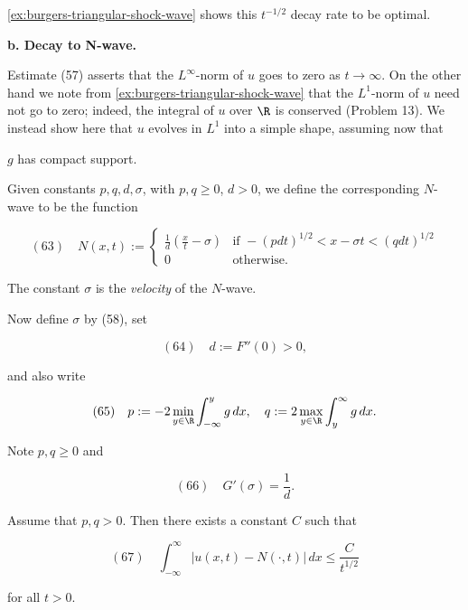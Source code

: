 \cref{ex:burgers-triangular-shock-wave} shows this $t^{-1/2}$ decay rate to be optimal.

\textbf{b. Decay to N-wave.}

Estimate (57) asserts that the $L^\infty$-norm of $u$ goes to zero as $t \to \infty$. On the other hand we note from \cref{ex:burgers-triangular-shock-wave} that the $L^1$-norm of $u$ need not go to zero; indeed, the integral of $u$ over $\R$ is conserved (Problem 13). We instead show here that $u$ evolves in $L^1$ into a simple shape, assuming now that

$g$ has compact support.

\begin{definition}[N-wave]
\label{def:n-wave}
Given constants $p, q, d, \sigma$, with $p, q \geq 0$, $d > 0$, we define the corresponding $N$-wave to be the function

$$(63) \quad N(x,t) := \begin{cases} \frac{1}{d}\left(\frac{x}{t} - \sigma\right) & \text{if } -(pdt)^{1/2} < x - \sigma t < (qdt)^{1/2} \\ 0 & \text{otherwise.} \end{cases}$$

\begin{figure}[h]\centering
\end{figure}

The constant $\sigma$ is the \textit{velocity} of the $N$-wave.
\end{definition}

Now define $\sigma$ by (58), set

$$(64) \quad d := F''(0) > 0,$$

and also write

$$(65) \quad p := -2 \min_{y \in \R} \int_{-\infty}^{y} g \, dx, \quad q := 2 \max_{y \in \R} \int_{y}^{\infty} g \, dx.$$

Note $p, q \geq 0$ and

$$(66) \quad G'(\sigma) = \frac{1}{d}.$$

\begin{theorem}
\label{thm:asymptotics-l1-norm-n-wave}
Assume that $p, q > 0$. Then there exists a constant $C$ such that

$$(67) \quad \int_{-\infty}^{\infty} |u(x,t) - N(\cdot, t)| \, dx \leq \frac{C}{t^{1/2}}$$

for all $t > 0$.
\end{theorem}

